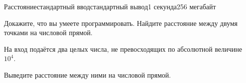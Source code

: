\begin{problem}{Расстояние}{стандартный ввод}{стандартный вывод}{1 секунда}{256 мегабайт}

Докажите, что вы умеете программировать. Найдите расстояние между двумя точками на числовой прямой.

\InputFile
На вход подаётся два целых числа, не превосходящих по абсолютной величине $10^4$.

\OutputFile
Выведите расстояние между ними на числовой прямой.

\Examples

\begin{example}
%
%
%
\end{example}

\end{problem}

